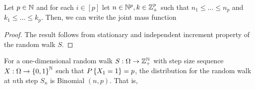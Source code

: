 \documentclass[letterpaper,10pt,english]{article}
\begin{document}
\begin{cor} 
Let $p \in \mathbb{N}$ and for each $i \in [p]$ let $n \in \mathbb{N}^p, k \in \mathbb{Z}_+^p$ such that $n_1 \le \dots \le n_p$ and $k_1 \le \dots \le k_p$. 
Then, we can write the joint mass function 
\end{cor}
\begin{proof}
The result follows from stationary and independent increment property of the random walk $S$. %
\end{proof}


\begin{rem} 
For a one-dimensional random walk $S: \Omega\to\mathbb{Z}_+^{\mathbb{N}}$ with \iid step size sequence $X:\Omega\to\left\{0,1\right\}^{\mathbb{N}}$ such that $P\left\{X_1 = 1\right\} = p$, 
the distribution for the random walk at $n$th step $S_n$ is Binomial $(n,p)$. 
That is, 
\end{rem}
\end{document}
